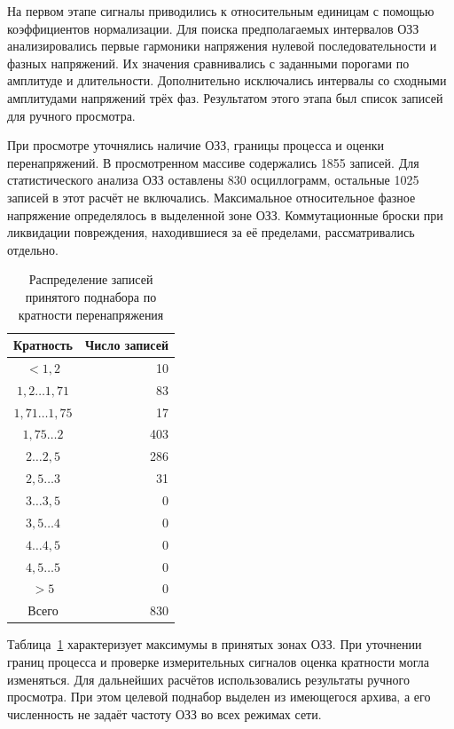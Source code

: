 На первом этапе сигналы приводились к относительным единицам
с помощью коэффициентов нормализации. Для поиска предполагаемых
интервалов ОЗЗ анализировались первые гармоники напряжения нулевой
последовательности и фазных напряжений. Их значения сравнивались
с заданными порогами по амплитуде и длительности. Дополнительно
исключались интервалы со сходными амплитудами напряжений трёх фаз.
Результатом этого этапа был список записей для ручного просмотра.

При просмотре уточнялись наличие ОЗЗ, границы процесса и оценки
перенапряжений. В просмотренном массиве содержались 1855 записей.
Для статистического анализа ОЗЗ оставлены 830 осциллограмм,
остальные 1025 записей в этот расчёт не включались.
Максимальное относительное фазное напряжение определялось
в выделенной зоне ОЗЗ. Коммутационные броски при ликвидации
повреждения, находившиеся за её пределами, рассматривались отдельно.

\begin{table}[htbp]
\centering
\caption{Распределение записей принятого поднабора по кратности перенапряжения}
\label{tab:ch3_earth_fault_selection}
\begin{tabular}{|c|r|}
\hline
Кратность & Число записей \\
\hline
$<1{,}2$ & 10 \\
$1{,}2\ldots1{,}71$ & 83 \\
$1{,}71\ldots1{,}75$ & 17 \\
$1{,}75\ldots2$ & 403 \\
$2\ldots2{,}5$ & 286 \\
$2{,}5\ldots3$ & 31 \\
$3\ldots3{,}5$ & 0 \\
$3{,}5\ldots4$ & 0 \\
$4\ldots4{,}5$ & 0 \\
$4{,}5\ldots5$ & 0 \\
$>5$ & 0 \\
\hline
Всего & 830 \\
\hline
\end{tabular}
\end{table}

Таблица~\ref{tab:ch3_earth_fault_selection} характеризует
максимумы в принятых зонах ОЗЗ. При уточнении границ процесса
и проверке измерительных сигналов оценка кратности могла изменяться.
Для дальнейших расчётов использовались результаты ручного просмотра.
При этом целевой поднабор выделен из имеющегося архива,
а его численность не задаёт частоту ОЗЗ во всех режимах сети.

